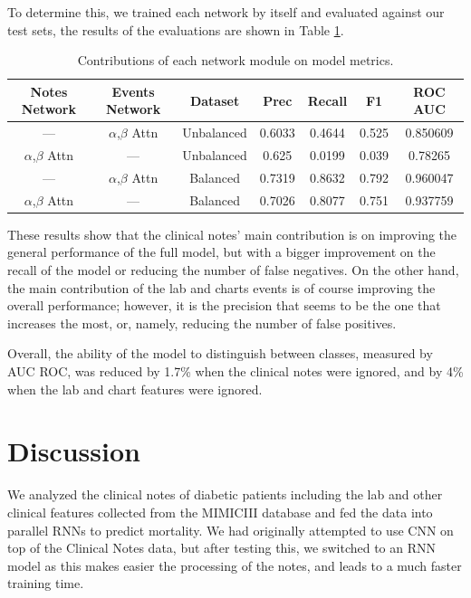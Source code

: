 \documentclass{sigkddExp}
\begin{document}
To determine this, we trained each network by itself and evaluated 
against our test sets, the results of the evaluations are shown in Table \ref{tab:networks-contributions}.

\begin{table}
       \centering
       \caption{Contributions of each network module on model metrics.}
       \label{tab:networks-contributions}
       \begin{tabular}{|c|c|c|c|c|c|c|} \hline
              \textbf{Notes Network}&	\textbf{Events Network	}&\textbf{Dataset}&	\textbf{Prec}&	\textbf{Recall}&	\textbf{F1}&	\textbf{ROC AUC} \\ \hline      
              ---	&$\alpha$,$\beta$ Attn	&Unbalanced		&0.6033	&0.4644	&0.525	&0.850609 \\ \hline
              $\alpha$,$\beta$ Attn	&---	&Unbalanced		&0.625	&0.0199	&0.039	&0.78265 \\ \hline
              ---	&$\alpha$,$\beta$ Attn	&Balanced		&0.7319	&0.8632	&0.792	&0.960047 \\ \hline
              $\alpha$,$\beta$ Attn	&---	&Balanced		&0.7026	&0.8077	&0.751	&0.937759 \\ \hline
       \end{tabular}
\end{table}

These results show that the clinical notes’ main contribution is on 
improving the general performance of the full model, but with a bigger 
improvement on the recall of the model or reducing the number of false 
negatives.  On the other hand, the main contribution of the lab and charts 
events is of course improving the overall performance; however, it is the 
precision that seems to be the one that increases the most, or, namely, 
reducing the number of false positives.   

Overall, the ability of the model to distinguish between classes, 
measured by AUC ROC, was reduced by 1.7\% when the clinical notes were 
ignored, and by 4\% when the lab and chart features were ignored.

\section{Discussion}
We analyzed the clinical notes of diabetic patients including the 
lab and other clinical features collected from the MIMICIII database 
and fed the data into parallel RNNs to predict mortality. We had 
originally attempted to use CNN on top of the Clinical Notes data, 
but after testing this, we switched to an RNN model as this makes easier 
the processing of the notes, and leads to a much faster training time. 
\end{document}
